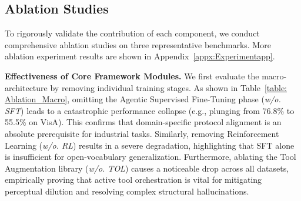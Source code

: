\documentclass{llmxive}
\begin{document}
\subsection{Ablation Studies}




To rigorously validate the contribution of each component, we conduct comprehensive ablation studies on three representative benchmarks. More ablation experiment results are shown in Appendix~\ref{appx:Experimentapp}.

\begin{table}[t]
\vspace{-1.5em}
\centering
{}
\vspace{-1.0em}

\caption{Ablation of main proposed modules.}
\label{table: Ablation_Macro}
\end{table}

\textbf{Effectiveness of Core Framework Modules.} 
We first evaluate the macro-architecture by removing individual training stages. As shown in Table~\ref{table: Ablation_Macro}, omitting the Agentic Supervised Fine-Tuning phase (\emph{w/o. SFT}) leads to a catastrophic performance collapse (e.g., plunging from 76.8\% to 55.5\% on VisA). This confirms that domain-specific protocol alignment is an absolute prerequisite for industrial tasks. Similarly, removing Reinforcement Learning (\emph{w/o. RL}) results in a severe degradation, highlighting that SFT alone is insufficient for open-vocabulary generalization. Furthermore, ablating the Tool Augmentation library (\emph{w/o. TOL}) causes a noticeable drop across all datasets, empirically proving that active tool orchestration is vital for mitigating perceptual dilution and resolving complex structural hallucinations.
\end{document}
